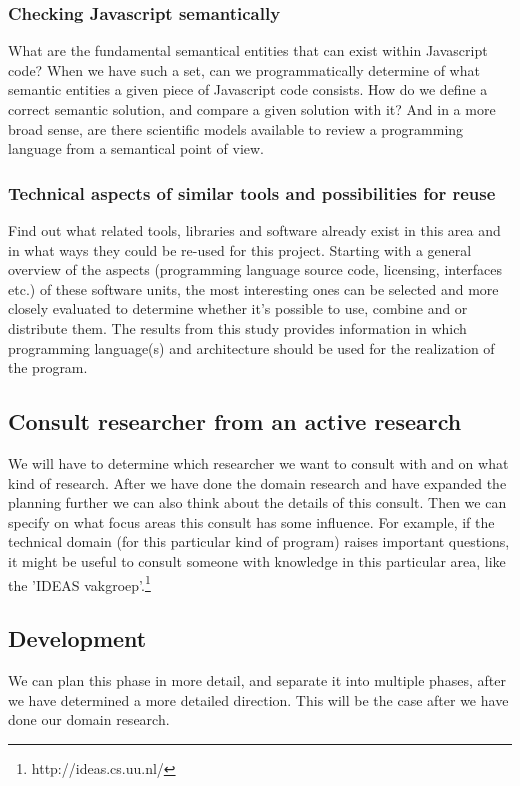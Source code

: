 \documentclass{article}
\begin{document}
\begin{itemize}
\subsubsection{Checking Javascript semantically}
What are the fundamental semantical entities that can exist within Javascript code? When we have such a set, can we programmatically determine of what semantic entities a given piece of Javascript code consists. How do we define a correct semantic solution, and compare a given solution with it? And in a more broad sense, are there scientific models available to review a programming language from a semantical point of view.
\subsubsection{Technical aspects of similar tools and possibilities for reuse}
Find out what related tools, libraries and software already exist in this area and in what ways they could be re-used for this project. Starting with a general overview of the aspects (programming language source code, licensing, interfaces etc.) of these software units, the most interesting ones can be selected and more closely evaluated to determine whether it's possible to use, combine and or distribute them. The results from this study provides information in which programming language(s) and architecture should be used for the realization of the program.

\subsection{Consult researcher from an active research}
We will have to determine which researcher we want to consult with and on what kind of research. After we have done the domain research and have expanded the planning further we can also think about the details of this consult. Then we can specify on what focus areas this consult has some influence. For example, if the technical domain (for this particular kind of program) raises important questions, it might be useful to consult someone with knowledge in this particular area, like the 'IDEAS vakgroep'.\footnote{http://ideas.cs.uu.nl/}\\

\subsection{Development}
We can plan this phase in more detail, and separate it into multiple phases, after we have determined a more detailed direction. This will be the case after we have done our domain research.


\end{itemize}
\end{document}
